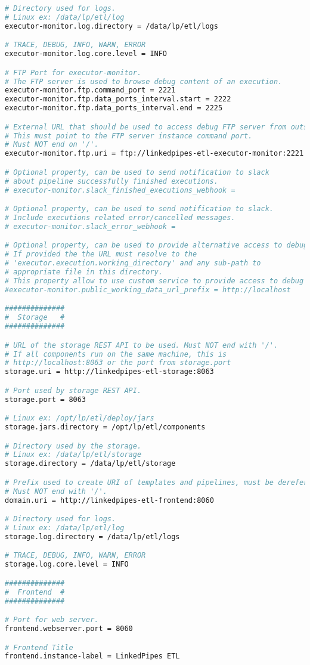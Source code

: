 \begin{lstlisting}[language=bash,]
# Directory used for logs.
# Linux ex: /data/lp/etl/log
executor-monitor.log.directory = /data/lp/etl/logs

# TRACE, DEBUG, INFO, WARN, ERROR
executor-monitor.log.core.level = INFO

# FTP Port for executor-monitor.
# The FTP server is used to browse debug content of an execution.
executor-monitor.ftp.command_port = 2221
executor-monitor.ftp.data_ports_interval.start = 2222
executor-monitor.ftp.data_ports_interval.end = 2225

# External URL that should be used to access debug FTP server from outside.
# This must point to the FTP server instance command port.
# Must NOT end on '/'.
executor-monitor.ftp.uri = ftp://linkedpipes-etl-executor-monitor:2221

# Optional property, can be used to send notification to slack
# about pipeline successfully finished executions.
# executor-monitor.slack_finished_executions_webhook =

# Optional property, can be used to send notification to slack.
# Include executions related error/cancelled messages.
# executor-monitor.slack_error_webhook =

# Optional property, can be used to provide alternative access to debug files.
# If provided the the URL must resolve to the
# 'executor.execution.working_directory' and any sub-path to
# appropriate file in this directory.
# This property allow to use custom service to provide access to debug data.
#executor-monitor.public_working_data_url_prefix = http://localhost

##############
#  Storage   #
##############

# URL of the storage REST API to be used. Must NOT end with '/'.
# If all components run on the same machine, this is
# http://localhost:8063 or the port from storage.port
storage.uri = http://linkedpipes-etl-storage:8063

# Port used by storage REST API.
storage.port = 8063

# Linux ex: /opt/lp/etl/deploy/jars
storage.jars.directory = /opt/lp/etl/components

# Directory used by the storage.
# Linux ex: /data/lp/etl/storage
storage.directory = /data/lp/etl/storage

# Prefix used to create URI of templates and pipelines, must be dereferencable.
# Must NOT end with '/'.
domain.uri = http://linkedpipes-etl-frontend:8060

# Directory used for logs.
# Linux ex: /data/lp/etl/log
storage.log.directory = /data/lp/etl/logs

# TRACE, DEBUG, INFO, WARN, ERROR
storage.log.core.level = INFO

##############
#  Frontend  #
##############

# Port for web server.
frontend.webserver.port = 8060

# Frontend Title
frontend.instance-label = LinkedPipes ETL
\end{lstlisting}	